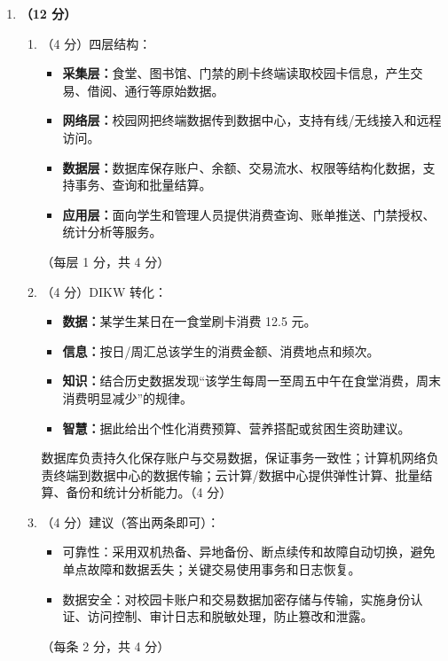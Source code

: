 \documentclass[a4paper,11pt]{article}
\begin{document}
\begin{enumerate}[start=29, label=\textbf{\arabic*.}, leftmargin=2.4em, itemsep=0.55em]
\item \textbf{（12 分）}
\begin{enumerate}[label=（\arabic*）, leftmargin=2.2em, itemsep=2pt]
  \item （4 分）四层结构：
  \begin{itemize}[leftmargin=1.8em, itemsep=1pt]
    \item \textbf{采集层：}食堂、图书馆、门禁的刷卡终端读取校园卡信息，产生交易、借阅、通行等原始数据。
    \item \textbf{网络层：}校园网把终端数据传到数据中心，支持有线/无线接入和远程访问。
    \item \textbf{数据层：}数据库保存账户、余额、交易流水、权限等结构化数据，支持事务、查询和批量结算。
    \item \textbf{应用层：}面向学生和管理人员提供消费查询、账单推送、门禁授权、统计分析等服务。
  \end{itemize}
  \hfill（每层 1 分，共 4 分）

  \item （4 分）DIKW 转化：
  \begin{itemize}[leftmargin=1.8em, itemsep=1pt]
    \item \textbf{数据：}某学生某日在一食堂刷卡消费 12.5 元。
    \item \textbf{信息：}按日/周汇总该学生的消费金额、消费地点和频次。
    \item \textbf{知识：}结合历史数据发现“该学生每周一至周五中午在食堂消费，周末消费明显减少”的规律。
    \item \textbf{智慧：}据此给出个性化消费预算、营养搭配或贫困生资助建议。
  \end{itemize}
  数据库负责持久化保存账户与交易数据，保证事务一致性；计算机网络负责终端到数据中心的数据传输；云计算/数据中心提供弹性计算、批量结算、备份和统计分析能力。\hfill（4 分）

  \item （4 分）建议（答出两条即可）：
  \begin{itemize}[leftmargin=1.8em, itemsep=1pt]
    \item 可靠性：采用双机热备、异地备份、断点续传和故障自动切换，避免单点故障和数据丢失；关键交易使用事务和日志恢复。
    \item 数据安全：对校园卡账户和交易数据加密存储与传输，实施身份认证、访问控制、审计日志和脱敏处理，防止篡改和泄露。
  \end{itemize}
  \hfill（每条 2 分，共 4 分）
\end{enumerate}

\end{enumerate}
\end{document}
